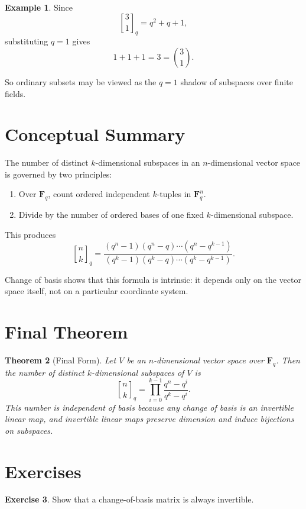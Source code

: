 \documentclass[11pt]{article}
\newtheorem{theorem}{Theorem}[section]
\theoremstyle{definition}
\newtheorem{example}[theorem]{Example}
\newtheorem{exercise}[theorem]{Exercise}
\theoremstyle{remark}
\newcommand{\F}{\mathbf{F}}
\newcommand{\qbinom}[2]{\genfrac{[}{]}{0pt}{}{#1}{#2}_q}
\begin{document}
	\begin{example}
		Since
		\[
		\qbinom{3}{1}=q^2+q+1,
		\]
		substituting \(q=1\) gives
		\[
		1+1+1=3=\binom{3}{1}.
		\]
	\end{example}
	
	So ordinary subsets may be viewed as the \(q=1\) shadow of subspaces over finite fields.
	
	\section{Conceptual Summary}
	
	The number of distinct \(k\)-dimensional subspaces in an \(n\)-dimensional vector space is governed by two principles:
	
	\begin{enumerate}[label=\arabic*.]
		\item Over \(\F_q\), count ordered independent \(k\)-tuples in \(\F_q^n\).
		\item Divide by the number of ordered bases of one fixed \(k\)-dimensional subspace.
	\end{enumerate}
	
	This produces
	\[
	\qbinom{n}{k}
	=
	\frac{(q^n-1)(q^n-q)\cdots(q^n-q^{k-1})}
	{(q^k-1)(q^k-q)\cdots(q^k-q^{k-1})}.
	\]
	
	Change of basis shows that this formula is intrinsic: it depends only on the vector space itself, not on a particular coordinate system.
	
	\section{Final Theorem}
	
	\begin{theorem}[Final Form]
		Let \(V\) be an \(n\)-dimensional vector space over \(\F_q\). Then the number of distinct \(k\)-dimensional subspaces of \(V\) is
		\[
		\boxed{
			\qbinom{n}{k}
			=
			\prod_{i=0}^{k-1}\frac{q^n-q^i}{q^k-q^i}
		}.
		\]
		This number is independent of basis because any change of basis is an invertible linear map, and invertible linear maps preserve dimension and induce bijections on subspaces.
	\end{theorem}
	
	\section{Exercises}
	
	\begin{exercise}
		Show that a change-of-basis matrix is always invertible.
	\end{exercise}
	
\end{document}
